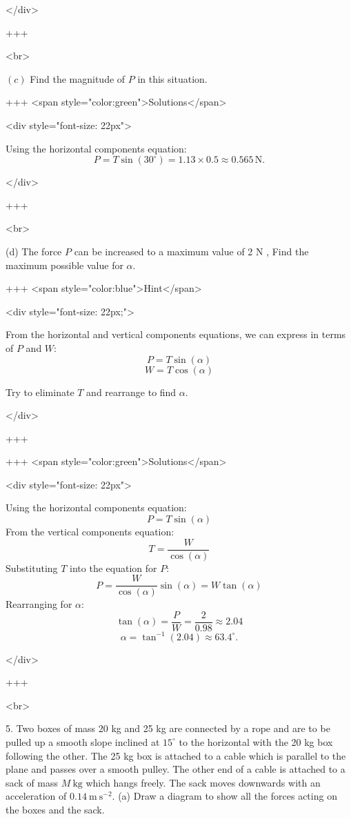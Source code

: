 </div>

+++

<br>

\((c)\) Find the magnitude of $P$ in this situation.


+++ <span style="color:green">Solutions</span>

<div style="font-size: 22px">

Using the horizontal components equation:
\[P = T \sin(30^\circ) = 1.13 \times 0.5 \approx 0.565 \, \text{N}.\]

</div>

+++

<br>


(d) The force $P$ can be increased to a maximum value of 2 N , Find the maximum possible value for $\alpha$.

+++ <span style="color:blue">Hint</span>

<div style="font-size: 22px;">

From the horizontal and vertical components equations, we can express \alpha in terms of \(P\) and \(W\):
\[P = T \sin(\alpha)\]
\[W = T \cos(\alpha)\]

Try to eliminate \(T\) and rearrange to find \(\alpha\).

</div>

+++

+++ <span style="color:green">Solutions</span>

<div style="font-size: 22px">

Using the horizontal components equation:
\[P = T \sin(\alpha)\]
From the vertical components equation:
\[T = \frac{W}{\cos(\alpha)}\]
Substituting \(T\) into the equation for \(P\):
\[P = \frac{W}{\cos(\alpha)} \sin(\alpha) = W \tan(\alpha)\]
Rearranging for \(\alpha\):
\[\tan(\alpha) = \frac{P}{W} = \frac{2}{0.98} \approx 2.04\]
\[\alpha = \tan^{-1}(2.04) \approx 63.4^{\circ}.\]

</div>

+++

<br>



5. Two boxes of mass 20 kg and 25 kg are connected by a rope and are to be pulled up a smooth slope inclined at $15^{\circ}$ to the horizontal with the 20 kg box following the other. The 25 kg box is attached to a cable which is parallel to the plane and passes over a smooth pulley. The other end of a cable is attached to a sack of mass $M \mathrm{~kg}$ which hangs freely. The sack moves downwards with an acceleration of $0.14 \mathrm{~m} \mathrm{~s}^{-2}$.
(a) Draw a diagram to show all the forces acting on the boxes and the sack.

